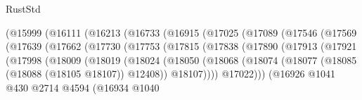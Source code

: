 \begin{lexlean}{RustStd}
\begin{coremodule}
                            (@15999
                              (@16111
                                (@16213
                                  (@16733
                                    (@16915
                                      (@17025
                                        (@17089
                                          (@17546
                                            (@17569
                                              (@17639
                                                (@17662
                                                  (@17730
                                                    (@17753
                                                      (@17815
                                                        (@17838
                                                          (@17890
                                                            (@17913
                                                              (@17921
                                                                (@17998
                                                                  (@18009
                                                                    (@18019
                                                                      (@18024
                                                                        (@18050
                                                                          (@18068
                                                                            (@18074
                                                                              (@18077
                                                                                (@18085
                                                                                  (@18088
                                                                                    (@18105 @18107))
                                                                                  @12408))
                                                                              @18107))))
                                                                      @17022)))
                                                                (@16926
                                                                  @1041
                                                                  @430
                                                                  @2714
                                                                  @4594
                                                                  (@16934
                                                                    @1040

\end{coremodule}
\end{lexlean}
